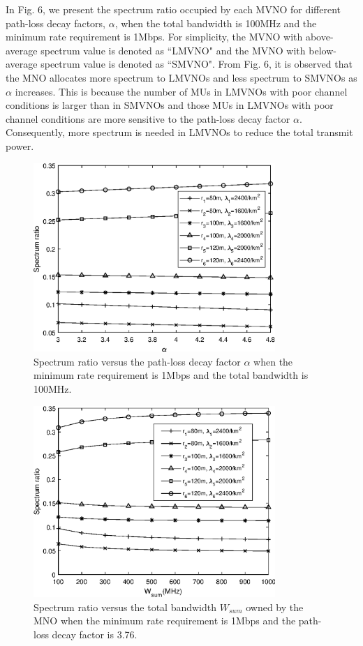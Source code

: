\documentclass[journal]{IEEEtran}
\begin{document}
In Fig. 6, we present the spectrum ratio occupied by each MVNO for different path-loss decay factors, $\alpha$, when the total bandwidth is 100MHz and the minimum rate requirement is 1Mbps. For simplicity, the MVNO with above-average spectrum value is denoted as ``LMVNO" and the MVNO with below-average spectrum value is denoted as ``SMVNO". From Fig. 6, it is observed that the MNO allocates more spectrum to LMVNOs and less spectrum to SMVNOs as $\alpha$ increases. This is because the number of MUs in LMVNOs with poor channel conditions is larger than in SMVNOs and those MUs in LMVNOs with poor channel conditions are more sensitive to the path-loss decay factor $\alpha$. Consequently, more spectrum is needed in LMVNOs to reduce the total transmit power.
 
\begin{figure}
	\centering
	\includegraphics[width=3.6in]{SR_alpha.eps}
	\caption{Spectrum ratio versus the path-loss decay factor $\alpha$ when the minimum rate requirement is 1Mbps and the total bandwidth is 100MHz.}
\end{figure}


\begin{figure}
	\centering
	\includegraphics[width=3.6in]{SR_wsum.eps}
	\caption{Spectrum ratio versus the total bandwidth $W_{sum}$ owned by the MNO when the minimum rate requirement is 1Mbps and the path-loss decay factor is 3.76.}
\end{figure}
\end{document}
